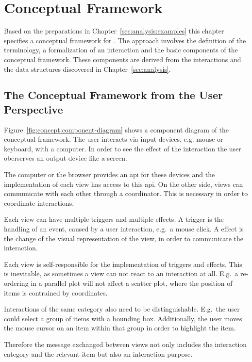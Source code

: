 \chapter{Conceptual Framework}\label{sec:concept}
Based on the preparations in Chapter~\ref{sec:analysis:examples} this chapter specifies a conceptual framework for \cmvs{}.
The approach involves the definition of the terminology, a formalization of an interaction and the basic components of the conceptual framework.
These components are derived from the interactions and the data structures discovered in Chapter~\ref{sec:analysis}.

\section{The Conceptual Framework from the User Perspective}\label{sec:concept:framework}

Figure~\ref{fig:concept:component-diagram} shows a component diagram of the conceptual framework.
The user interacts via input devices, e.g. mouse or keyboard, with a computer.
In order to see the effect of the interaction the user oberserves an output device like a screen.

The computer or the browser provides an \gls{api} for these devices and the implementation of each view has access to this \gls{api}.
On the other side, views can communicate with each other through a coordinator.
This is necessary in order to coordinate interactions.

Each view can have multiple triggers and multiple effects.
A trigger is the handling of an event, caused by a user interaction, e.g.\ a mouse click.
A effect is the change of the visual representation of the view, in order to communicate the interaction.

Each view is self-responsible for the implementation of triggers and effects.
This is inevitable, as sometimes a view can not react to an interaction at all.
E.g.\ a re-ordering in a parallel plot will not affect a scatter plot, where the position of items is contrained by coordinates.

Interactions of the same category also need to be distinguishable.
E.g.\ the user could select a group of items with a bounding box.
Additionally, the user moves the mouse cursor on an item within that group in order to highlight the item.

Therefore the message exchanged between views not only includes the interaction category and the relevant item but also an interaction purpose.


